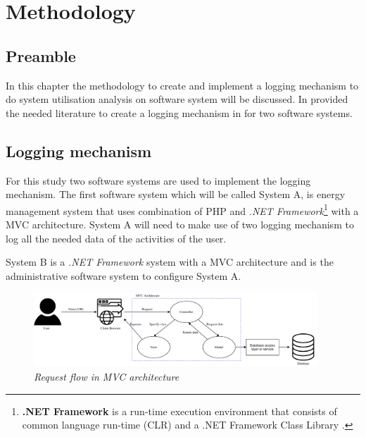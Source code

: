 \chapter{Methodology}
\label{chap:2}

\section{Preamble}
In this chapter the methodology to create and implement a logging mechanism to do system utilisation analysis on software system will be discussed. In  provided the needed literature to create a logging mechanism in  for two software systems.

\section{Logging mechanism}\label{sec:Ch3_LoggingMechanism}
For this study two software systems are used to implement the logging mechanism. The first software system which will be called System A, is energy management system that uses combination of PHP and \textit{.NET Framework}\footnote{\label{ftn:NetFramework}\textbf{.NET Framework} is a run-time execution environment that consists of common language run-time (CLR) and a .NET Framework Class Library \cite{Harkness2007}.} with a MVC architecture. System A will need to make use of two logging mechanism to log all the needed data of the activities of the user.\par System B is a \textit{.NET Framework} system with a MVC architecture and is the administrative software system to configure System A.

\begin{figure}[!htb] %
	\centering %
	\includegraphics[width=0.95\textwidth]{Images/Chapter2/Flow_MVC_Architecture/Flow_MVC_Architecture.pdf}
	\caption[Request flow in MVC architecture]
	{\textit{Request flow in MVC architecture \cite{Gu2010}}}\label{fig:Flow_MVC_Architecture}
\end{figure}

